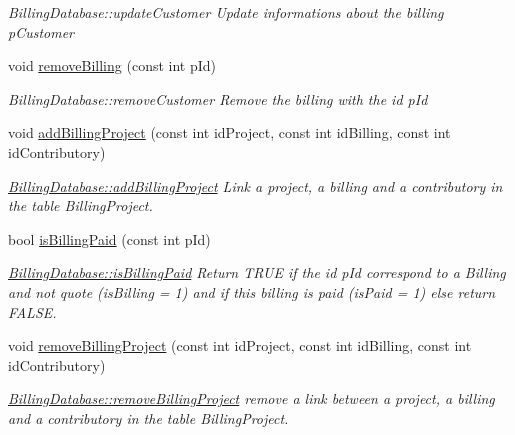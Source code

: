 \begin{DoxyCompactItemize}
\begin{DoxyCompactList}\small\item\em Billing\+Database\+::update\+Customer Update informations about the billing {\itshape p\+Customer} \end{DoxyCompactList}\item 
void \hyperlink{classDatabases_1_1BillingDatabase_aa6869fce7290e50723b5db5e125e9a6e}{remove\+Billing} (const int p\+Id)
\begin{DoxyCompactList}\small\item\em Billing\+Database\+::remove\+Customer Remove the billing with the id {\itshape p\+Id} \end{DoxyCompactList}\item 
void \hyperlink{classDatabases_1_1BillingDatabase_ab4eb6ce0f1126599012912d4869ad8b8}{add\+Billing\+Project} (const int id\+Project, const int id\+Billing, const int id\+Contributory)
\begin{DoxyCompactList}\small\item\em \hyperlink{classDatabases_1_1BillingDatabase_ab4eb6ce0f1126599012912d4869ad8b8}{Billing\+Database\+::add\+Billing\+Project} Link a project, a billing and a contributory in the table Billing\+Project. \end{DoxyCompactList}\item 
bool \hyperlink{classDatabases_1_1BillingDatabase_a0e1651d61ecec830edf4da0413cda325}{is\+Billing\+Paid} (const int p\+Id)
\begin{DoxyCompactList}\small\item\em \hyperlink{classDatabases_1_1BillingDatabase_a0e1651d61ecec830edf4da0413cda325}{Billing\+Database\+::is\+Billing\+Paid} Return T\+R\+U\+E if the id {\itshape p\+Id} correspond to a Billing and not quote (is\+Billing = 1) and if this billing is paid (is\+Paid = 1) else return F\+A\+L\+S\+E. \end{DoxyCompactList}\item 
void \hyperlink{classDatabases_1_1BillingDatabase_ad6320bcb8053fc0097939221546f7ecf}{remove\+Billing\+Project} (const int id\+Project, const int id\+Billing, const int id\+Contributory)
\begin{DoxyCompactList}\small\item\em \hyperlink{classDatabases_1_1BillingDatabase_ad6320bcb8053fc0097939221546f7ecf}{Billing\+Database\+::remove\+Billing\+Project} remove a link between a project, a billing and a contributory in the table Billing\+Project. \end{DoxyCompactList}\item 

\end{DoxyCompactItemize}
